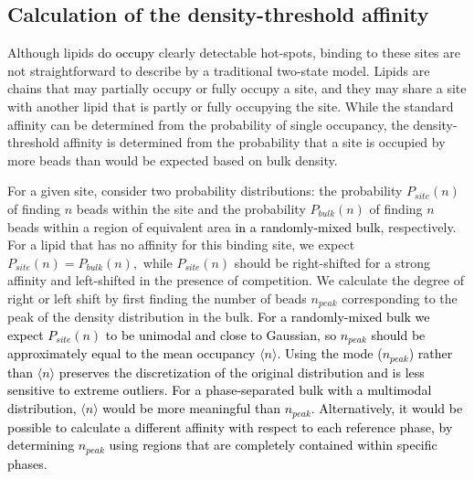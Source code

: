 \documentclass[%
 aip,
 amsmath,amssymb,
 preprint,%
]{revtex4-1}\usepackage{setspace}
\newcommand{\newaffinity}{density-threshold affinity}
\newcommand{\liam}[1]{\textcolor{black}{#1}}
\newcommand{\grace}[1]{\textcolor{black}{{#1}}}
\begin{document}
 \subsection{Calculation of the \newaffinity}
 
Although lipids \liam{do occupy} clearly detectable hot-spots, binding to these sites are not straightforward to describe by a traditional two-state model. Lipids are chains that may partially occupy or fully occupy a site, and they may share a site with another lipid that is partly or fully occupying the site.  While the standard affinity can be determined from the probability of single occupancy, the \newaffinity{} is determined from the probability that a site is occupied by more beads than would be expected based on bulk density. %


For a given site, consider %
two probability distributions: the probability $P_{site}(n)$ of finding $n$ beads within the site and the probability $P_{bulk}(n)$ of finding $n$ beads within a region of equivalent area \grace{in a randomly-mixed bulk}, respectively. For a lipid that has no affinity for this binding site, we expect $P_{site}(n) = P_{bulk}(n),$ while $P_{site}(n)$ should be right-shifted for a strong affinity and left-shifted in the presence of competition. %
We calculate the degree of right or left shift by first finding the number of beads $n_{peak}$ corresponding to the peak of the density distribution in the bulk.  \grace{ For a randomly-mixed bulk we expect $P_{site}(n)$ to be unimodal and close to Gaussian, so $n_{peak}$ should be approximately equal to the mean occupancy $\langle n\rangle$. Using the mode ($n_{peak}$) rather than $\langle n\rangle$ preserves the discretization of the original distribution and is less sensitive to extreme outliers. For a phase-separated bulk with a multimodal distribution, $\langle n\rangle$ would be more meaningful than $n_{peak}$. Alternatively, it would be possible to calculate a different affinity with respect to each reference phase,  by determining $n_{peak}$ using regions that are completely contained within specific phases. }
\end{document}
